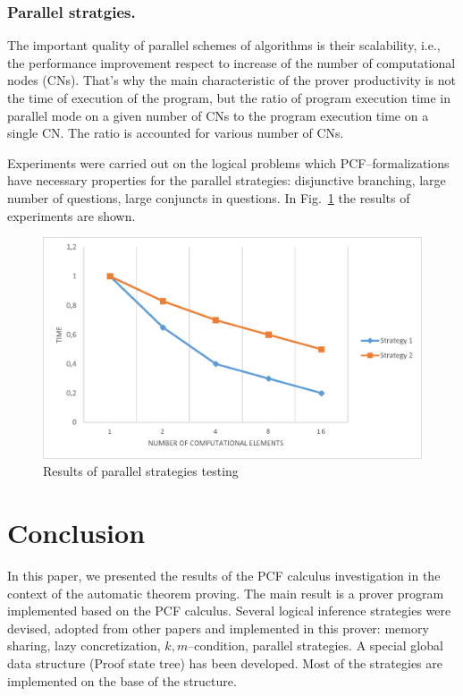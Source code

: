 \documentclass[runningheads,a4paper]{llncs}
\begin{document}
\subsubsection{Parallel stratgies.}
The important quality of parallel schemes of algorithms is their scalability, i.e., the performance improvement respect to increase of the number of computational nodes (CNs). That’s why the main characteristic of the prover productivity is not the time of execution of the program, but the ratio of program execution time in parallel mode on a given number of CNs to the program execution time on a single CN. The ratio is accounted for various number of CNs.

Experiments were carried out on the logical problems which PCF--formalizations have necessary properties for the parallel strategies: disjunctive branching, large number of questions, large conjuncts in questions. In Fig.~\ref{fig:parallel} the results of experiments are shown.

\begin{figure}[h]
  \centering
  \includegraphics[width=0.8\linewidth]{img/Parallel.eps}
  \caption{Results of parallel strategies testing}
  \label{fig:parallel}
\end{figure}




\section*{Conclusion}
In this paper, we presented the results of the PCF calculus investigation in the context of the automatic theorem proving. The main result is a prover program implemented based on the PCF calculus. Several logical inference strategies were devised, adopted from other papers and implemented in this prover: memory sharing, lazy concretization, $k,m$--condition, parallel strategies. A special global data structure (Proof state tree) has been developed. Most of the strategies are implemented on the base of the structure.
\end{document}
